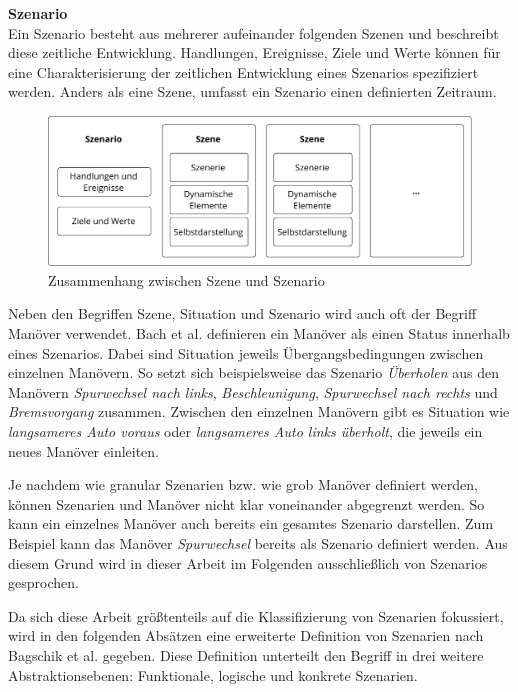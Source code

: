 \noindent\textbf{Szenario}\\
Ein Szenario besteht aus mehrerer aufeinander folgenden Szenen und beschreibt diese zeitliche Entwicklung. Handlungen, Ereignisse, Ziele und Werte können für eine Charakterisierung der zeitlichen Entwicklung eines Szenarios spezifiziert werden. Anders als eine Szene, umfasst ein Szenario einen definierten Zeitraum.

\begin{figure}[h]
\centering
\includegraphics[scale=0.7]{images/relation_sc_sc.pdf}
\caption{Zusammenhang zwischen Szene und Szenario \cite{ulbrich2015defining}}
\label{fig_relation_sc_sc}
\end{figure}

Neben den Begriffen Szene, Situation und Szenario wird auch oft der Begriff Manöver verwendet. Bach et al. \cite{bach2016model} definieren ein Manöver als einen Status innerhalb eines Szenarios. Dabei sind Situation jeweils Übergangsbedingungen zwischen einzelnen Manövern. So setzt sich beispielsweise das Szenario \textit{Überholen} aus den Manövern \textit{Spurwechsel nach links}, \textit{Beschleunigung}, \textit{Spurwechsel nach rechts} und \textit{Bremsvorgang} zusammen. Zwischen den einzelnen Manövern gibt es Situation wie \textit{langsameres Auto voraus} oder \textit{langsameres Auto links überholt}, die jeweils ein neues Manöver einleiten.

Je nachdem wie granular Szenarien bzw. wie grob Manöver definiert werden, können Szenarien und Manöver nicht klar voneinander abgegrenzt werden. So kann ein einzelnes Manöver auch bereits ein gesamtes Szenario darstellen. Zum Beispiel kann das Manöver \textit{Spurwechsel} bereits als Szenario definiert werden. Aus diesem Grund wird in dieser Arbeit im Folgenden ausschließlich von Szenarios gesprochen.

Da sich diese Arbeit größtenteils auf die Klassifizierung von Szenarien fokussiert, wird in den folgenden Absätzen eine erweiterte Definition von Szenarien nach Bagschik et al. \cite{bagschik2017szenarien} gegeben. Diese Definition unterteilt den Begriff in drei weitere Abstraktionsebenen: Funktionale, logische und konkrete Szenarien.

